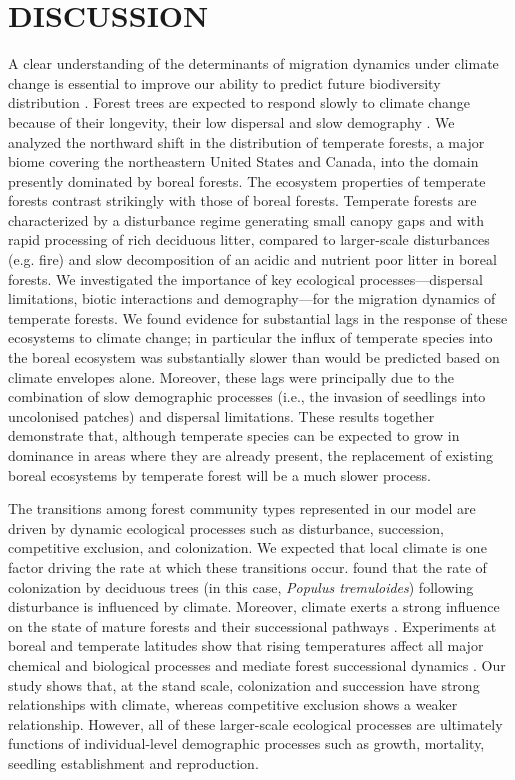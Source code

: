 \section*{\uppercase{Discussion}}

A clear understanding of the determinants of migration dynamics under climate change is essential to
improve our ability to predict future biodiversity distribution \citep{Svenning2014a}. Forest trees
are expected to respond slowly to climate change because of their longevity, their low dispersal and
slow demography \citep{Renwick2014,Vanderwel2014}. We analyzed the northward shift in the
distribution of temperate forests, a major biome covering the northeastern United States and Canada,
into the domain presently dominated by boreal forests.  The ecosystem properties of temperate
forests contrast strikingly with those of boreal forests. Temperate forests are characterized by a
disturbance regime generating small canopy gaps and with rapid processing of rich deciduous litter,
compared to larger-scale disturbances (e.g. fire) and slow decomposition of an acidic and nutrient
poor litter in boreal forests.  We investigated the importance of key ecological
processes---dispersal limitations, biotic interactions and demography---for the migration dynamics
of temperate forests. We found evidence for substantial lags in the response of these ecosystems to
climate change; in particular the influx of temperate species into the boreal ecosystem was
substantially slower than would be predicted based on climate envelopes alone. Moreover, these lags
were principally due to the combination of slow demographic processes  (i.e., the invasion of
seedlings into uncolonised patches) and dispersal limitations. These results together demonstrate
that, although temperate species can be expected to grow in dominance in areas where they are
already present, the replacement of existing boreal ecosystems by temperate forest will be a much
slower process.

The transitions among forest community types represented in our model are driven by dynamic
ecological processes such as disturbance,  succession, competitive exclusion, and colonization.  We
expected that local climate is one factor driving the rate at which these transitions occur.
\citet{Landhusser2010} found that the rate of colonization by deciduous trees (in this case,
\textit{Populus tremuloides}) following disturbance is influenced by climate. Moreover, climate
exerts a strong influence on the state of mature forests and their successional pathways
\citep{Anderson-Teixeira2013}. Experiments at boreal and temperate latitudes show that rising
temperatures affect all major chemical and biological processes and mediate forest successional
dynamics \citep{Saxe2001}. Our study shows that, at the stand scale, colonization and succession
have strong relationships with climate, whereas competitive exclusion shows a weaker relationship.
However, all of these larger-scale ecological processes are ultimately functions of individual-level
demographic processes such as growth, mortality, seedling establishment and reproduction.

